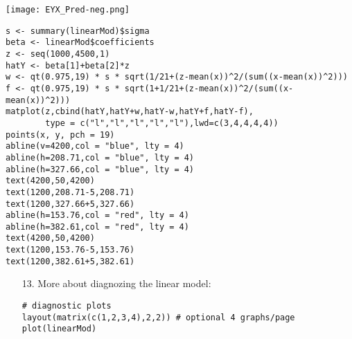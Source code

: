 \begin{frame}[fragile]
\begin{center}
\texttt{[image: EYX\_Pred-neg.png]}
\end{center}
\end{frame}
\begin{frame}[fragile]
\begin{center}
\begin{minipage}{0.8\textwidth}
\begin{lstlisting}
s <- summary(linearMod)$sigma
beta <- linearMod$coefficients
z <- seq(1000,4500,1)
hatY <- beta[1]+beta[2]*z
w <- qt(0.975,19) * s * sqrt(1/21+(z-mean(x))^2/(sum((x-mean(x))^2)))
f <- qt(0.975,19) * s * sqrt(1+1/21+(z-mean(x))^2/(sum((x-mean(x))^2)))
matplot(z,cbind(hatY,hatY+w,hatY-w,hatY+f,hatY-f),
        type = c("l","l","l","l","l"),lwd=c(3,4,4,4,4))
points(x, y, pch = 19)
abline(v=4200,col = "blue", lty = 4)
abline(h=208.71,col = "blue", lty = 4)
abline(h=327.66,col = "blue", lty = 4)
text(4200,50,4200)
text(1200,208.71-5,208.71)
text(1200,327.66+5,327.66)
abline(h=153.76,col = "red", lty = 4)
abline(h=382.61,col = "red", lty = 4)
text(4200,50,4200)
text(1200,153.76-5,153.76)
text(1200,382.61+5,382.61)
\end{lstlisting}
		\end{minipage}
	\end{center}
\end{frame}
\begin{frame}[fragile]

	\begin{enumerate}
		\item[13.] More about diagnozing the linear model:
			\vfill
		\item[]
			\begin{center}
				\begin{minipage}{0.7\textwidth}
\begin{lstlisting}
# diagnostic plots
layout(matrix(c(1,2,3,4),2,2)) # optional 4 graphs/page
plot(linearMod)
\end{lstlisting}
\end{minipage}
\end{center}
	\end{enumerate}
\end{frame}
